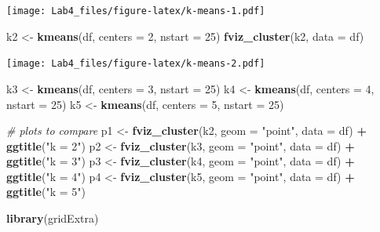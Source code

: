 \documentclass[
]{article}
\newenvironment{Shaded}{\begin{snugshade}}{\end{snugshade}}
\newcommand{\CommentTok}[1]{\textcolor[rgb]{0.56,0.35,0.01}{\textit{#1}}}
\newcommand{\DataTypeTok}[1]{\textcolor[rgb]{0.13,0.29,0.53}{#1}}
\newcommand{\DecValTok}[1]{\textcolor[rgb]{0.00,0.00,0.81}{#1}}
\newcommand{\KeywordTok}[1]{\textcolor[rgb]{0.13,0.29,0.53}{\textbf{#1}}}
\newcommand{\NormalTok}[1]{#1}
\newcommand{\OperatorTok}[1]{\textcolor[rgb]{0.81,0.36,0.00}{\textbf{#1}}}
\newcommand{\StringTok}[1]{\textcolor[rgb]{0.31,0.60,0.02}{#1}}
\begin{document}
\texttt{[image: Lab4\_files/figure-latex/k-means-1.pdf]}

\begin{Shaded}
\begin{Highlighting}[]
\NormalTok{k2 <-}\StringTok{ }\KeywordTok{kmeans}\NormalTok{(df, }\DataTypeTok{centers =} \DecValTok{2}\NormalTok{, }\DataTypeTok{nstart =} \DecValTok{25}\NormalTok{)}
\KeywordTok{fviz_cluster}\NormalTok{(k2, }\DataTypeTok{data =}\NormalTok{ df)}
\end{Highlighting}
\end{Shaded}

\texttt{[image: Lab4\_files/figure-latex/k-means-2.pdf]}

\begin{Shaded}
\begin{Highlighting}[]
\NormalTok{k3 <-}\StringTok{ }\KeywordTok{kmeans}\NormalTok{(df, }\DataTypeTok{centers =} \DecValTok{3}\NormalTok{, }\DataTypeTok{nstart =} \DecValTok{25}\NormalTok{)}
\NormalTok{k4 <-}\StringTok{ }\KeywordTok{kmeans}\NormalTok{(df, }\DataTypeTok{centers =} \DecValTok{4}\NormalTok{, }\DataTypeTok{nstart =} \DecValTok{25}\NormalTok{)}
\NormalTok{k5 <-}\StringTok{ }\KeywordTok{kmeans}\NormalTok{(df, }\DataTypeTok{centers =} \DecValTok{5}\NormalTok{, }\DataTypeTok{nstart =} \DecValTok{25}\NormalTok{)}

\CommentTok{# plots to compare}
\NormalTok{p1 <-}\StringTok{ }\KeywordTok{fviz_cluster}\NormalTok{(k2, }\DataTypeTok{geom =} \StringTok{"point"}\NormalTok{, }\DataTypeTok{data =}\NormalTok{ df) }\OperatorTok{+}\StringTok{ }\KeywordTok{ggtitle}\NormalTok{(}\StringTok{"k = 2"}\NormalTok{)}
\NormalTok{p2 <-}\StringTok{ }\KeywordTok{fviz_cluster}\NormalTok{(k3, }\DataTypeTok{geom =} \StringTok{"point"}\NormalTok{,  }\DataTypeTok{data =}\NormalTok{ df) }\OperatorTok{+}\StringTok{ }\KeywordTok{ggtitle}\NormalTok{(}\StringTok{"k = 3"}\NormalTok{)}
\NormalTok{p3 <-}\StringTok{ }\KeywordTok{fviz_cluster}\NormalTok{(k4, }\DataTypeTok{geom =} \StringTok{"point"}\NormalTok{,  }\DataTypeTok{data =}\NormalTok{ df) }\OperatorTok{+}\StringTok{ }\KeywordTok{ggtitle}\NormalTok{(}\StringTok{"k = 4"}\NormalTok{)}
\NormalTok{p4 <-}\StringTok{ }\KeywordTok{fviz_cluster}\NormalTok{(k5, }\DataTypeTok{geom =} \StringTok{"point"}\NormalTok{,  }\DataTypeTok{data =}\NormalTok{ df) }\OperatorTok{+}\StringTok{ }\KeywordTok{ggtitle}\NormalTok{(}\StringTok{"k = 5"}\NormalTok{)}

\KeywordTok{library}\NormalTok{(gridExtra)}
\end{Highlighting}
\end{Shaded}
\end{document}
